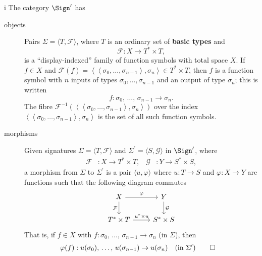 \begin{partsolution}{i}
The category \(\Sign^\prime\) has
\begin{description}
\item[objects]
Pairs \(\Sigma = \langle T, \mathcal{F}\rangle\), where \(T\) is an ordinary set of \textbf{basic types} and
\begin{equation*}
\mathcal{F} : X \to T^* \times T,
\end{equation*}
is a ``display-indexed'' family of function symbols with total space \(X\).
If \(f \in X\) and \(\mathcal{F}(f) = \left\langle\left\langle\sigma_0,\ldots,\sigma_{n-1}\right\rangle,\sigma_n\right\rangle \in T^* \times T\), then \(f\) is a function symbol with \(n\) inputs of types \(\sigma_0, \ldots, \sigma_{n-1}\) and an output of type \(\sigma_n\); this is written
\begin{equation*}
f : \sigma_0,\,\ldots,\,\sigma_{n-1} \to \sigma_n.
\end{equation*}
The fibre \(\mathcal{F}^{-1}\left(\left\langle\left\langle\sigma_0,\ldots,\sigma_{n-1}\right\rangle,\sigma_n\right\rangle\right)\) over the index \(\left\langle\left\langle\sigma_0,\ldots,\sigma_{n-1}\right\rangle,\sigma_n\right\rangle\) is the set of all such function symbols.
\item[morphisms]
Given signatures \(\Sigma = \langle T, \mathcal{F}\rangle\) and \(\Sigma^\prime = \langle S, \mathcal{G}\rangle\) in \(\Sign^\prime\), where 
\begin{align*}
\mathcal{F} &: X \to T^* \times T, &
\mathcal{G} &: Y \to S^* \times S,
\end{align*}
a morphism from \(\Sigma\) to \(\Sigma^\prime\) is a pair \(\langle u, \varphi\rangle\) where \(u : T \to S\) and \(\varphi : X \to Y\) are functions such that the following diagram commutes
\begin{equation*}
\begin{tikzcd}
X \arrow[r, "\varphi"] \arrow[d, "\mathcal{F}"{left}]
& Y \arrow[d, "\mathcal{G}"{right}] \\
T^* \times T \arrow[r, "u^* \times u"]
& S^* \times S
\end{tikzcd}
\end{equation*}
That is, if \(f \in X\) with \(f : \sigma_0,\,\ldots,\,\sigma_{n-1}\to\sigma_n\) (in \(\Sigma\)), then
\begin{align*}
\varphi(f) &: u(\sigma_0),\, \ldots,\, u(\sigma_{n-1}) \to u(\sigma_n)
&&\text{(in \(\Sigma^\prime\))}
\qedhere
\end{align*}
\end{description}
\end{partsolution}

